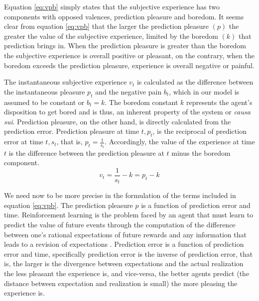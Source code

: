 \documentclass[11pt, onecolumn]{article}
\begin{document}
Equation \ref{eq:vpb} simply states that the subjective experience has two components with opposed valences, prediction pleasure and boredom. It seems clear from equation  \ref{eq:vpb} that the larger the prediction pleasure $(p)$ the greater the value of the subjective experience, limited by the boredom $(k)$ that prediction brings in.  
When the prediction pleasure is greater than the boredom the subjective experience is overall positive or pleasant, on the contrary, when the boredom exceeds the prediction pleasure, experience is overall negative or painful. 

The instantaneous subjective experience $v_t$ is calculated as the difference between the instantaneous pleasure $p_t$ and the negative pain $b_t$, which in our model is assumed to be constant or $b_t=k$. The boredom constant $k$ represents the agent's disposition to get bored and is thus, an inherent property of the system or \emph{causa sui}. Prediction pleasure, on the other hand, is directly calculated from the prediction error.
Prediction pleasure at time $t, p_t$, is the reciprocal of prediction error at time $t, s_t$, that is, $p_t = \frac{1}{s_t}$.
Accordingly, the value of the experience at time $t$ is the difference between the prediction pleasure at $t$ minus the boredom component.
\begin{equation}
    v_t = \frac{1}{s_t} -k = p_t - k
\label{eq:vpbt}
\end{equation}

We need now to be more precise in the formulation of the terms included in equation \ref{eq:vpb}. The prediction pleasure $p$ is a function of prediction error and time. Reinforcement learning is the problem faced by an agent that must learn to predict the value of future events through the computation of the difference between one’s rational expectations of future rewards and any information that leads to a revision of expectations \citep{glimcher_understanding_2011}. Prediction error is a function of prediction error and time, specifically prediction error is the inverse of prediction error, that is, the larger is the divergence between expectations and the actual realization the less pleasant the experience is, and vice-versa, the better agents predict (the distance between expectation and realization is small) the more pleasing the experience is.
\end{document}
